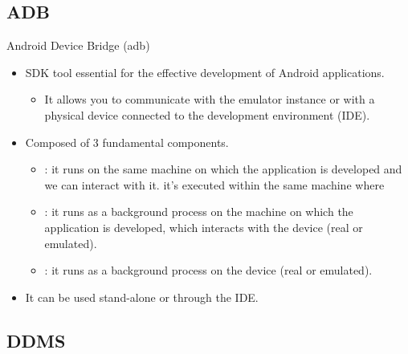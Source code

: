 \documentclass{beamer}
\begin{document}
  \subsection{ADB}

    \begin{frame}{Android Device Bridge (adb)}
      \begin{itemize}
        \item SDK tool essential for the effective development of Android
        applications.
        \begin{itemize}
          \item It allows you to communicate with the emulator instance or with a
          physical device connected to the development environment (IDE).
        \end{itemize}
        \item Composed of 3 fundamental components.
        \begin{itemize}
          \item {}: it runs on the same machine on which the
          application is developed and we can interact with it. it's executed
          within the same machine where 
          \item {}: it runs as a background process on the machine on
          which the application is developed, which interacts with the device
          (real or emulated).
          \item {}: it runs as a background process on the device (real
          or emulated). 
        \end{itemize}
        \item It can be used stand-alone or through the IDE.
      \end{itemize}
    \end{frame}

  \subsection{DDMS}
\end{document}
